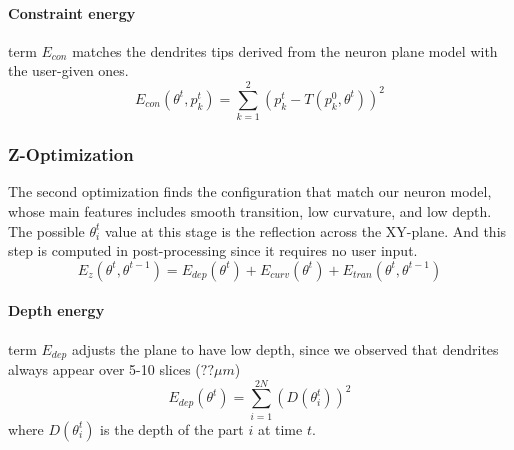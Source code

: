 \documentclass[10pt,letterpaper]{article}
\begin{document}
\paragraph{Constraint energy} term $E_{con}$ matches the dendrites tips derived from the neuron plane model with the user-given ones. 
\begin{equation} \label{eq:Econ}
E_{con}(\theta^t, p^t_k) = \sum_{k=1}^{2} (p_k^t - T(p_k^0, \theta^t))^2
\end{equation} 





\subsubsection{Z-Optimization} \label{sec:z-optim}
The second optimization finds the configuration that match our neuron model, whose main features includes smooth transition, low curvature, and low depth. The possible $\theta_i^t$ value at this stage is the reflection across the XY-plane. And this step is computed in post-processing since it requires no user input.
\begin{equation}
E_{z}(\theta^t,\theta^{t-1}) = E_{dep}(\theta^t) + E_{curv}(\theta^t) + E_{tran}(\theta^t,\theta^{t-1})
\end{equation}

\paragraph{Depth energy} term $E_{dep}$ adjusts the plane to have low depth, since we observed that dendrites always appear over 5-10 slices ($?? \mu m$) %
\begin{equation}
E_{dep}(\theta^t) = \sum_{i=1}^{2N} \left( D(\theta_i^t) \right)^2
\end{equation} 
where $D(\theta_i^t)$ is the depth of the part $i$ at time $t$.
\end{document}
